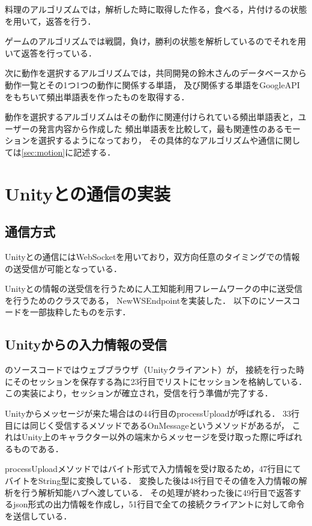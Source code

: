 料理のアルゴリズムでは，解析した時に取得した作る，食べる，片付けるの状態を用いて，返答を行う．

ゲームのアルゴリズムでは戦闘，負け，勝利の状態を解析しているのでそれを用いて返答を行っている．

次に動作を選択するアルゴリズムでは，共同開発の鈴木さんのデータベースから動作一覧とその1つ1つの動作に関係する単語，
及び関係する単語をGoogleAPIをもちいて頻出単語表を作ったものを取得する．

動作を選択するアルゴリズムはその動作に関連付けられている頻出単語表と，ユーザーの発言内容から作成した
頻出単語表を比較して，最も関連性のあるモーションを選択するようになっており，
その具体的なアルゴリズムや通信に関しては\ref{sec:motion}に記述する．

\section{Unityとの通信の実装}
\subsection{通信方式}
Unityとの通信にはWebSocketを用いており，双方向任意のタイミングでの情報の送受信が可能となっている．

Unityとの情報の送受信を行うために人工知能利用フレームワークの中に送受信を行うためのクラスである，
NewWSEndpointを実装した．
以下のにソースコードを一部抜粋したものを示す．


\subsection{Unityからの入力情報の受信}
のソースコードではウェブブラウザ（Unityクライアント）が，
接続を行った時にそのセッションを保存する為に23行目でリストにセッションを格納している．
この実装により，セッションが確立され，受信を行う準備が完了する．

Unityからメッセージが来た場合はの44行目のprocessUploadが呼ばれる．
33行目には同じく受信するメソッドであるOnMessageというメソッドがあるが，
これはUnity上のキャラクター以外の端末からメッセージを受け取った際に呼ばれるものである．

processUploadメソッドではバイト形式で入力情報を受け取るため，47行目にてバイトをString型に変換している．
変換した後は48行目でその値を入力情報の解析を行う解析知能ハブへ渡している．
その処理が終わった後に49行目で返答するjson形式の出力情報を作成し，51行目で全ての接続クライアントに対して命令を送信している．


